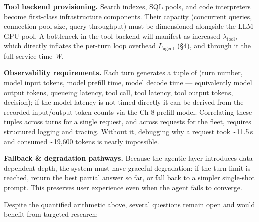 \textbf{Tool backend provisioning.} Search indexes, SQL pools, and code
interpreters become first-class infrastructure components. Their
capacity (concurrent queries, connection pool size, query throughput)
must be dimensioned alongside the LLM GPU pool. A bottleneck in the tool
backend will manifest as increased \(\lambda_\text{tool}\), which
directly inflates the per-turn loop overhead \(L_\text{agent}\) (§4),
and through it the full service time \emph{W}.

\textbf{Observability requirements.} Each turn generates a tuple of
(turn number, model input tokens, model prefill time, model decode time
--- equivalently model output tokens, queueing latency, tool call, tool
latency, tool output tokens, decision); if the model latency is not
timed directly it can be derived from the recorded input/output token
counts via the Ch 8 prefill model. Correlating these tuples across turns
for a single request, and across requests for the fleet, requires
structured logging and tracing. Without it, debugging why a request took
\textasciitilde11.5\,s and consumed \textasciitilde19,600 tokens is
nearly impossible.

\textbf{Fallback \& degradation pathways.} Because the agentic layer
introduces data-dependent depth, the system must have graceful
degradation: if the turn limit is reached, return the best partial
answer so far, or fall back to a simpler single-shot prompt. This
preserves user experience even when the agent fails to converge.

\label{what-we-still-dont-know}


Despite the quantified arithmetic above, several questions remain open
and would benefit from targeted research:

